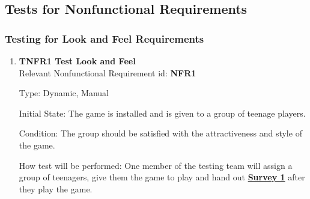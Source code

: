 \documentclass[12pt, titlepage]{article}
\begin{document}
\subsection{Tests for Nonfunctional Requirements}

\subsubsection{Testing for Look and Feel Requirements}

\begin{enumerate}

\item{\textbf{TNFR1 Test Look and Feel\\}}
Relevant Nonfunctional Requirement id: \textbf{NFR1}

Type: Dynamic, Manual

Initial State: The game is installed and is given to a group of teenage players.

Condition: The group should be satisfied with the attractiveness and style of the game.

How test will be performed: One member of the testing team will assign a group of teenagers, give them the game to play and hand out \hyperref[s1]{\bf Survey 1} after they play the game.

\end{enumerate}
\end{document}
